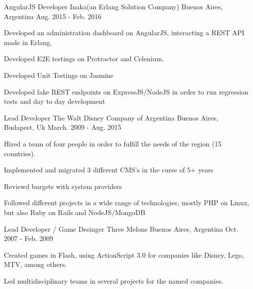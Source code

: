 \begin{cventries}
    \cventry
    {AngularJS Developer} %
    {Inaka(an Erlang Solution Company)} %
    {Buenos Aires, Argentina} %
    {Aug. 2015 - Feb. 2016} %
    {
    \begin{cvitems} %
        \item {Developed an administration dashboard on AngularJS, interacting a REST API made in Erlang.}
        \item {Developed E2E testings on Protractor and Celenium.}
        \item {Developed Unit Testings on Jasmine}
        \item {Developed fake REST endpoints on ExpressJS/NodeJS in order to run regression tests and day to day development}
    \end{cvitems}
    }
    \cventry
    {Lead Developer} %
    {The Walt Disney Company of Argentina} %
    {Buenos Aires, Budapest, Uk} %
    {March. 2009 - Aug. 2015} %
    {
    \begin{cvitems} %
        \item {Hired a team of four people in order to fulfill the needs of the region (15 countries).}
        \item {Implemented and migrated 3 different CMS's in the curse of 5+ years}
        \item {Reviewd burgets with system providers}
        \item {Followed different projects in a wide range of technologies, mostly PHP on Linux, but also Ruby on Rails and NodeJS/MongoDB}
    \end{cvitems}
    }

    \cventry
    {Lead Developer / Game Desinger} %
    {Three Melons} %
    {Buenos Aires, Argentina} %
    {Oct. 2007 - Feb. 2009} %
    {
    \begin{cvitems} %
        \item {Created games in Flash, using ActionScript 3.0 for companies like Disney, Lego, MTV, among others.}
        \item {Led multidisciplinary teams in several projects for the named companies.}
    \end{cvitems}
    }


\end{cventries}

